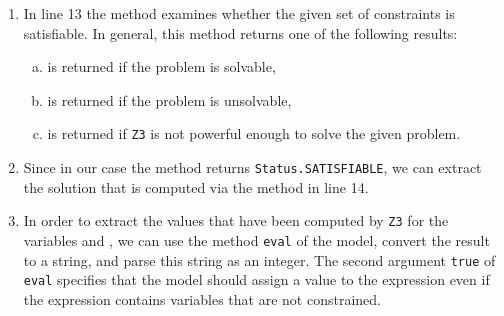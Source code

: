 \begin{enumerate}
      Unfortunately, \textsl{Java} does not support operator overloading.  Therefore, we have to use the
      following methods of the object \texttt{Z3}:
      \begin{enumerate}[(a)]
      \item $\texttt{Z3.mkAdd}(x, y)$ computes $x + y$,
      \item $\texttt{Z3.mkSub}(x, y)$ computes $x - y$,
      \item $\texttt{Z3.mkMul}(x, y)$ computes $x * y$,
      \item $\texttt{Z3.mkDiv}(x, y)$ computes $x / y$,
      \item $\texttt{Z3.mkEq}(x, y)$ computes $x = y$,
      \item $\texttt{Z3.mkNot}(\texttt{Z3.mkEq}(x, y))$ computes $x \not= y$,
      \item $\texttt{Z3.mkLe}(x, y)$ computes $x \leq y$,
      \item $\texttt{Z3.mkGe}(x, y)$ computes $x \geq y$,
      \item $\texttt{Z3.mkLt}(x, y)$ computes $x < y$,
      \item $\texttt{Z3.mkGt}(x, y)$ computes $x > y$.
      \end{enumerate}
      Integer constants have to be converted into \texttt{Z3} expressions using the method \texttt{mkInt}.
\item In line 13 the method  examines whether the given set of constraints is satisfiable.
      In general, this method returns one of the following results:
      \begin{enumerate}[(a)]
      \item {} is returned if the problem is solvable,
      \item {} is returned if the problem is unsolvable,
      \item {} is returned if \texttt{Z3} is not powerful enough to solve the given problem.
      \end{enumerate}
      
\item Since in our case the method  returns \texttt{Status.SATISFIABLE}, we can extract the
      solution that is computed via the method  in line 14.  
\item In order to extract the values that have been computed by \texttt{Z3} for the variables  and
      , we can use the method \texttt{eval} of the model, convert the result to a string, and parse
      this string as an integer.  The second argument \texttt{true} of \texttt{eval} specifies that the model
      should assign a value to the expression even if the expression contains variables that are not
      constrained.
\end{enumerate}
\pagebreak


